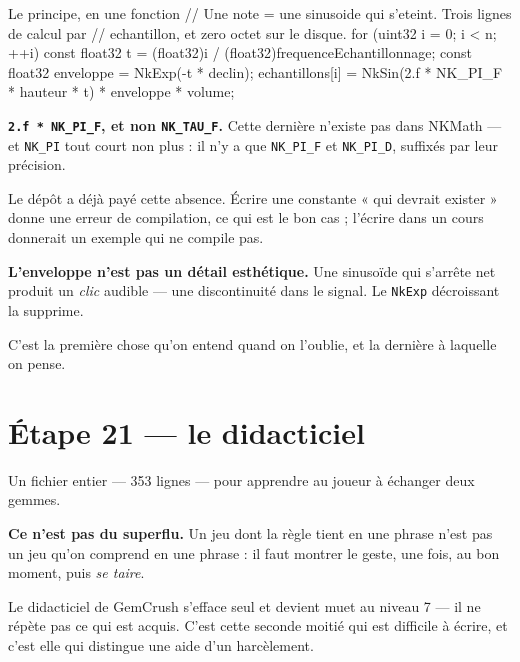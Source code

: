 \begin{nkcode}{Le principe, en une fonction}
// Une note = une sinusoide qui s'eteint. Trois lignes de calcul par
// echantillon, et zero octet sur le disque.
for (uint32 i = 0; i < n; ++i) {
    const float32 t = (float32)i / (float32)frequenceEchantillonnage;
    const float32 enveloppe = NkExp(-t * declin);
    echantillons[i] = NkSin(2.f * NK_PI_F * hauteur * t) * enveloppe * volume;
}
\end{nkcode}

\begin{nkpiege}
\textbf{\texttt{2.f * NK\_PI\_F}, et non \texttt{NK\_TAU\_F}.} Cette dernière
n'existe pas dans NKMath --- et \texttt{NK\_PI} tout court non plus : il n'y a
que \texttt{NK\_PI\_F} et \texttt{NK\_PI\_D}, suffixés par leur précision.

Le dépôt a déjà payé cette absence. Écrire une constante « qui devrait
exister » donne une erreur de compilation, ce qui est le bon cas ; l'écrire dans
un cours donnerait un exemple qui ne compile pas.
\end{nkpiege}

\begin{nkpiege}
\textbf{L'enveloppe n'est pas un détail esthétique.} Une sinusoïde qui s'arrête
net produit un \emph{clic} audible --- une discontinuité dans le signal. Le
\texttt{NkExp} décroissant la supprime.

C'est la première chose qu'on entend quand on l'oublie, et la dernière à
laquelle on pense.
\end{nkpiege}

\section{Étape 21 --- le didacticiel}

Un fichier entier --- 353 lignes --- pour apprendre au joueur à échanger deux
gemmes.

\begin{nkretenir}
\textbf{Ce n'est pas du superflu.} Un jeu dont la règle tient en une phrase n'est
pas un jeu qu'on comprend en une phrase : il faut montrer le geste, une fois, au
bon moment, puis \emph{se taire}.

Le didacticiel de GemCrush s'efface seul et devient muet au niveau 7 --- il ne
répète pas ce qui est acquis. C'est cette seconde moitié qui est difficile à
écrire, et c'est elle qui distingue une aide d'un harcèlement.
\end{nkretenir}

